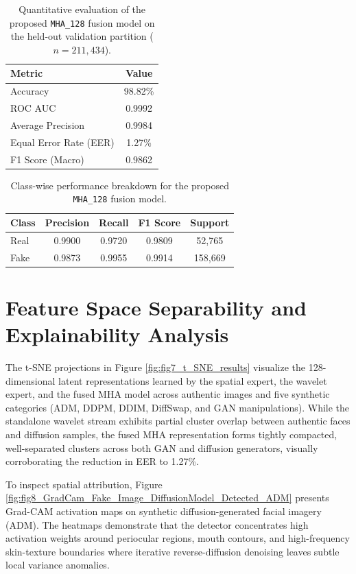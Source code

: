 \documentclass[fleqn,10pt]{wlscirep}
\begin{document}
\begin{table}[htbp]
\centering
\begin{tabular}{|l|c|}
\hline
\textbf{Metric} & \textbf{Value} \\
\hline
Accuracy & 98.82\% \\
ROC AUC & 0.9992 \\
Average Precision & 0.9984 \\
Equal Error Rate (EER) & 1.27\% \\
F1 Score (Macro) & 0.9862 \\
\hline
\end{tabular}
\caption{\label{tab:mhaQuantitative}Quantitative evaluation of the proposed \texttt{MHA\_128} fusion model on the held-out validation partition ($n=211{,}434$).}
\end{table}

\begin{table}[htbp]
\centering
\begin{tabular}{|l|c|c|c|c|}
\hline
\textbf{Class} & \textbf{Precision} & \textbf{Recall} & \textbf{F1 Score} & \textbf{Support} \\
\hline
Real & 0.9900 & 0.9720 & 0.9809 & 52{,}765 \\
Fake & 0.9873 & 0.9955 & 0.9914 & 158{,}669 \\
\hline
\end{tabular}
\caption{\label{tab:mhaCalssWise}Class-wise performance breakdown for the proposed \texttt{MHA\_128} fusion model.}
\end{table}
\newpage
\section*{Feature Space Separability and Explainability Analysis}
The t-SNE projections in Figure \ref{fig:fig7_t_SNE_results} visualize the 128-dimensional latent representations learned by the spatial expert, the wavelet expert, and the fused MHA model across authentic images and five synthetic categories (ADM, DDPM, DDIM, DiffSwap, and GAN manipulations). While the standalone wavelet stream exhibits partial cluster overlap between authentic faces and diffusion samples, the fused MHA representation forms tightly compacted, well-separated clusters across both GAN and diffusion generators, visually corroborating the reduction in EER to 1.27\%.

To inspect spatial attribution, Figure \ref{fig:fig8_GradCam_Fake_Image_DiffusionModel_Detected_ADM} presents Grad-CAM activation maps on synthetic diffusion-generated facial imagery (ADM). The heatmaps demonstrate that the detector concentrates high activation weights around periocular regions, mouth contours, and high-frequency skin-texture boundaries where iterative reverse-diffusion denoising leaves subtle local variance anomalies.
\end{document}
